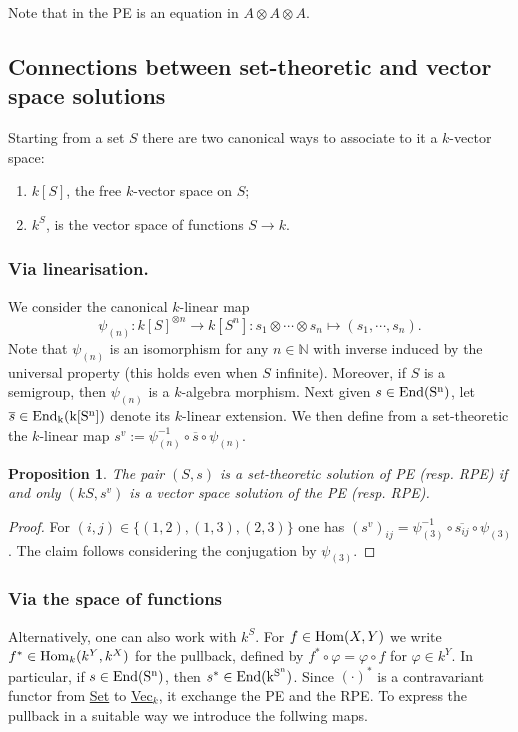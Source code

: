 \documentclass[a4paper,10pt]{amsart}
\newtheorem{proposition}[lemma]{Proposition}
\theoremstyle{definition}
\theoremstyle{remark}
\newcommand\End{\rm End}
\newcommand\Hom{{\rm Hom}}
\newcommand\ot{\otimes}
\newcommand{\N}{{\mathbb N}}
\begin{document}
Note that in  the PE is an equation in $A \ot A \ot A$.

\subsection{Connections between set-theoretic and vector space solutions}

Starting from a set $S$ there are two canonical ways to associate to it a $k$-vector space:
\begin{enumerate}
    \item $k[S]$, the free $k$-vector space on $S$;
    \item $k^S$, is the vector space of functions $S \to k$.
\end{enumerate}

\subsubsection{Via linearisation.}

We consider the canonical $k$-linear map
$$\psi_{(n)} : k[S]^{\ot n} \rightarrow k[S^n]: s_1 \ot \cdots \ot s_n \mapsto (s_1,\cdots, s_n).$$
Note that $\psi_{(n)}$ is an isomorphism for any $n\in \N$ with inverse induced by the universal property (this holds even when $S$ infinite). Moreover, if $S$ is a semigroup, then $\psi_{(n)}$ is a $k$-algebra morphism.
Next given $s\in \End(S^{n})$, let $\overline{s} \in \End_k(k[S^{n}])$ denote its $k$-linear extension. We then define from a set-theoretic the $k$-linear map $s^{v} := \psi^{-1}_{(n)}\circ \overline{s} \circ \psi_{(n)}$.

\begin{proposition}
    The pair $(S,s)$ is a set-theoretic solution of PE (resp. RPE) if and only $(kS, s^v)$ is a vector space solution of the PE (resp. RPE).
\end{proposition}
\begin{proof}
    For $(i,j)\in\{(1,2),(1,3),(2,3)\}$ one has $(s^{v})_{ij}=\psi_{(3)}^{-1}\circ \overline{s_{ij}}\circ \psi_{(3)}$.
    The claim follows considering the conjugation by $\psi_{(3)}$.
\end{proof}

\subsubsection{Via the space of functions}

Alternatively, one can also work with $k^S$. For $f \in \Hom(X,Y)$ we write $f^*\in \Hom_k(k^Y,k^X)$ for the pullback, defined by $f^*\circ\varphi = \varphi\circ f$ for $\varphi \in k^Y$. In particular, if $s \in \End(S^n)$, then $s^* \in \End(k^{S^n})$. Since $(\cdot)^*$ is a contravariant functor from \underline{Set} to \underline{Vec}$_k$, it exchange the PE and the RPE. To express the pullback in a suitable way we introduce the follwing maps.
\end{document}
